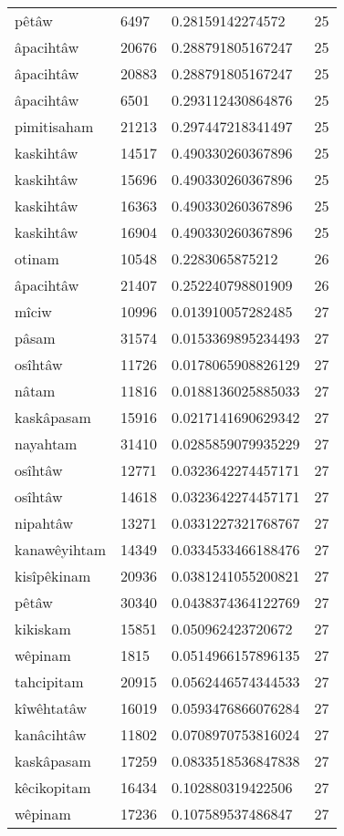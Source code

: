 \begin{longtable}{llll}
pêtâw & 6497 & 0.28159142274572 & 25 \\
âpacihtâw & 20676 & 0.288791805167247 & 25 \\
âpacihtâw & 20883 & 0.288791805167247 & 25 \\
âpacihtâw & 6501 & 0.293112430864876 & 25 \\
pimitisaham & 21213 & 0.297447218341497 & 25 \\
kaskihtâw & 14517 & 0.490330260367896 & 25 \\
kaskihtâw & 15696 & 0.490330260367896 & 25 \\
kaskihtâw & 16363 & 0.490330260367896 & 25 \\
kaskihtâw & 16904 & 0.490330260367896 & 25 \\
otinam & 10548 & 0.2283065875212 & 26 \\
âpacihtâw & 21407 & 0.252240798801909 & 26 \\
mîciw & 10996 & 0.013910057282485 & 27 \\
pâsam & 31574 & 0.0153369895234493 & 27 \\
osîhtâw & 11726 & 0.0178065908826129 & 27 \\
nâtam & 11816 & 0.0188136025885033 & 27 \\
kaskâpasam & 15916 & 0.0217141690629342 & 27 \\
nayahtam & 31410 & 0.0285859079935229 & 27 \\
osîhtâw & 12771 & 0.0323642274457171 & 27 \\
osîhtâw & 14618 & 0.0323642274457171 & 27 \\
nipahtâw & 13271 & 0.0331227321768767 & 27 \\
kanawêyihtam & 14349 & 0.0334533466188476 & 27 \\
kisîpêkinam & 20936 & 0.0381241055200821 & 27 \\
pêtâw & 30340 & 0.0438374364122769 & 27 \\
kikiskam & 15851 & 0.050962423720672 & 27 \\
wêpinam & 1815 & 0.0514966157896135 & 27 \\
tahcipitam & 20915 & 0.0562446574344533 & 27 \\
kîwêhtatâw & 16019 & 0.0593476866076284 & 27 \\
kanâcihtâw & 11802 & 0.0708970753816024 & 27 \\
kaskâpasam & 17259 & 0.0833518536847838 & 27 \\
kêcikopitam & 16434 & 0.102880319422506 & 27 \\
wêpinam & 17236 & 0.107589537486847 & 27 \\

\end{longtable}
